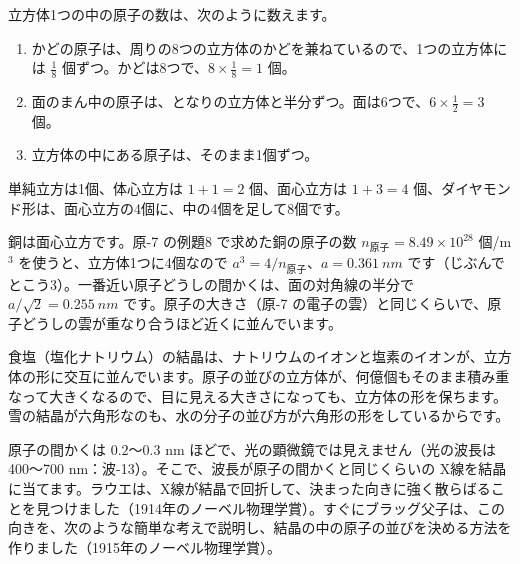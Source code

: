 立方体1つの中の原子の数は、次のように数えます。
\begin{enumerate}[label={\bkcircled{\arabic*}}, leftmargin=2.4\zw, itemsep=1pt, topsep=2pt]
\item かどの原子は、周りの8つの立方体のかどを兼ねているので、1つの立方体には $\tfrac18$ 個ずつ。かどは8つで、$8\times\tfrac18=1$ 個。
\item 面のまん中の原子は、となりの立方体と半分ずつ。面は6つで、$6\times\tfrac12=3$ 個。
\item 立方体の中にある原子は、そのまま1個ずつ。
\end{enumerate}
単純立方は1個、体心立方は $1+1=2$ 個、面心立方は $1+3=4$ 個、ダイヤモンド形は、面心立方の4個に、中の4個を足して8個です。

銅は面心立方です。原-7 の例題8 で求めた銅の原子の数 $n_{\text{原子}}=8.49\times10^{28}$ 個/m$^3$ を使うと、立方体1つに4個なので $a^3=4/n_{\text{原子}}$、$a=\qty{0.361}{nm}$ です（じぶんでとこう3）。一番近い原子どうしの間かくは、面の対角線の半分で $a/\sqrt2=\qty{0.255}{nm}$ です。原子の大きさ（原-7 の電子の雲）と同じくらいで、原子どうしの雲が重なり合うほど近くに並んでいます。

\begin{phmijika}
食塩（塩化ナトリウム）の結晶は、ナトリウムのイオンと塩素のイオンが、立方体の形に交互に並んでいます。原子の並びの立方体が、何億個もそのまま積み重なって大きくなるので、目に見える大きさになっても、立方体の形を保ちます。雪の結晶が六角形なのも、水の分子の並び方が六角形の形をしているからです。
\end{phmijika}

\label{ph:原-8:sec2}
原子の間かくは $0.2$〜$0.3$ nm ほどで、光の顕微鏡では見えません（光の波長は 400〜700 nm：波-13）。そこで、波長が原子の間かくと同じくらいの X線を結晶に当てます。ラウエは、X線が結晶で回折して、決まった向きに強く散らばることを見つけました（1914年のノーベル物理学賞）。すぐにブラッグ父子は、この向きを、次のような簡単な考えで説明し、結晶の中の原子の並びを決める方法を作りました（1915年のノーベル物理学賞）。


